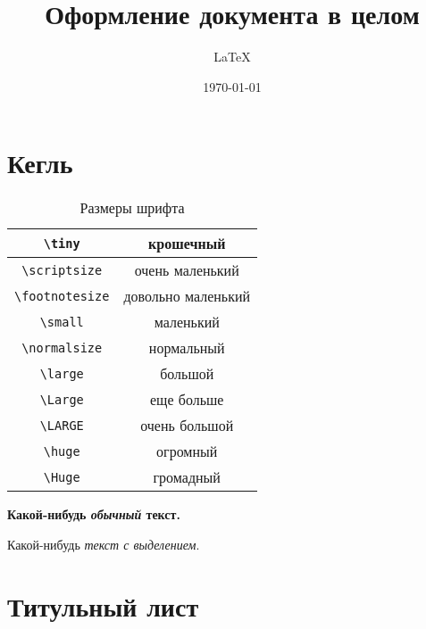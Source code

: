 \documentclass[a4paper,12pt]{article}
\author{\LaTeX{}}
\title{Оформление документа в целом}
\date{\today}
\theoremstyle{plain} %
\theoremstyle{definition} %
\theoremstyle{remark} %
\begin{document}

\maketitle

\section{Кегль}

\begin{table}[h!]
	\caption{Размеры шрифта}
	\centering
		\begin{tabular}{|c|c|}
		\hline	\verb|\tiny|      & \tiny        крошечный \\
		\hline	\verb|\scriptsize|   & \scriptsize  очень маленький\\
			\hline \verb|\footnotesize| & \footnotesize  довольно маленький \\
			\hline \verb|\small|        &  \small        маленький \\
			\hline \verb|\normalsize|   &  \normalsize  нормальный \\
			\hline \verb|\large|        &  \large       большой \\
			\hline \verb|\Large|        &  \Large       еще больше \\[5pt]
			\hline \verb|\LARGE|        &  \LARGE       очень большой \\[5pt]
			\hline \verb|\huge|         &  \huge        огромный \\[5pt]
			\hline \verb|\Huge|         &  \Huge        громадный \\ \hline
		\end{tabular}
\end{table}

\begin{Huge}
	\textbf{Какой-нибудь \textit{обычный}  текст.}
\end{Huge}

Какой-нибудь \emph{текст \emph{с} выделением}.

\section{Титульный лист}
\end{document}
